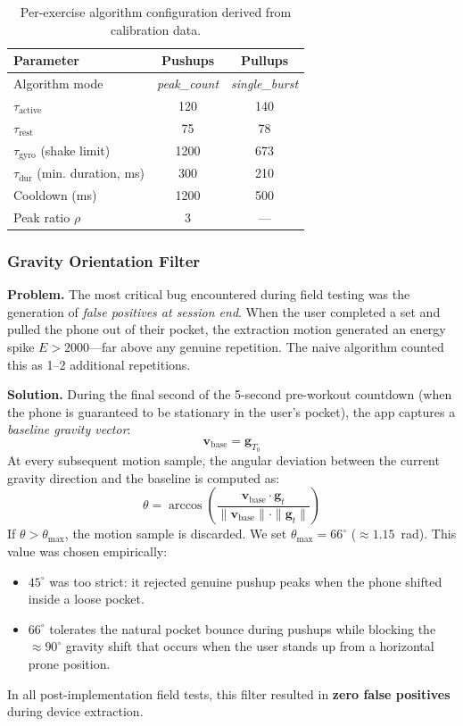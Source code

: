 \documentclass[11pt]{article}
\begin{document}
\begin{table}[H]
\centering
\small
\begin{tabular}{lcc}
\toprule
\textbf{Parameter} & \textbf{Pushups} & \textbf{Pullups} \\
\midrule
Algorithm mode & \textit{peak\_count} & \textit{single\_burst} \\
$\tau_{\text{active}}$ & 120 & 140 \\
$\tau_{\text{rest}}$ & 75 & 78 \\
$\tau_{\text{gyro}}$ (shake limit) & 1200 & 673 \\
$\tau_{\text{dur}}$ (min. duration, ms) & 300 & 210 \\
Cooldown (ms) & 1200 & 500 \\
Peak ratio $\rho$ & 3 & — \\
\bottomrule
\end{tabular}
\caption{Per-exercise algorithm configuration derived from calibration data.}
\label{tab:config}
\end{table}

\subsubsection{Gravity Orientation Filter}
\label{sec:gravity}

\textbf{Problem.} The most critical bug encountered during field testing was the generation of \textit{false positives at session end}. When the user completed a set and pulled the phone out of their pocket, the extraction motion generated an energy spike $E > 2000$—far above any genuine repetition. The naive algorithm counted this as 1--2 additional repetitions.

\textbf{Solution.} During the final second of the 5-second pre-workout countdown (when the phone is guaranteed to be stationary in the user's pocket), the app captures a \textit{baseline gravity vector}:
\begin{equation}
  \mathbf{v}_{\text{base}} = \mathbf{g}_{T_0}
  \label{eq:base_gravity}
\end{equation}
At every subsequent motion sample, the angular deviation between the current gravity direction and the baseline is computed as:
\begin{equation}
  \theta = \arccos\!\left( \frac{\mathbf{v}_{\text{base}} \cdot \mathbf{g}_t}{\|\mathbf{v}_{\text{base}}\| \cdot \|\mathbf{g}_t\|} \right)
  \label{eq:gravity_angle}
\end{equation}
If $\theta > \theta_{\text{max}}$, the motion sample is discarded. We set $\theta_{\text{max}} = 66^{\circ}$ ($\approx 1.15$~rad). This value was chosen empirically:
\begin{itemize}
  \item $45^{\circ}$ was too strict: it rejected genuine pushup peaks when the phone shifted inside a loose pocket.
  \item $66^{\circ}$ tolerates the natural pocket bounce during pushups while blocking the $\approx 90^{\circ}$ gravity shift that occurs when the user stands up from a horizontal prone position.
\end{itemize}
In all post-implementation field tests, this filter resulted in \textbf{zero false positives} during device extraction.
\end{document}
